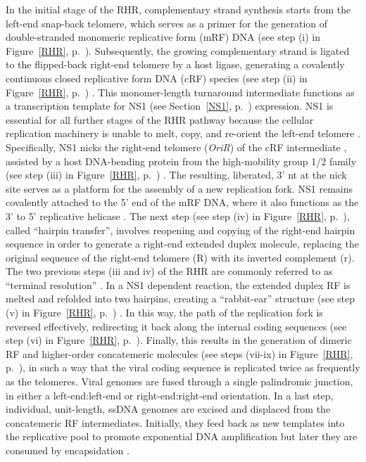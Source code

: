 In the initial stage of the RHR, complementary strand synthesis starts from the left-end snap-back telomere, which serves as a primer for the generation of double-stranded monomeric replicative form (mRF) DNA (see step (i) in Figure~\ref{RHR}, p.~\pageref{RHR}). Subsequently, the growing complementary strand is ligated to the flipped-back right-end telomere by a host ligase, generating a covalently continuous closed replicative form DNA (cRF) species (see step (ii) in Figure~\ref{RHR}, p.~\pageref{RHR}) \cite{pmid2911112, pmid2543770}. This monomer-length turnaround intermediate functions as a transcription template for NS1 (see Section~\ref{NS1}, p.~\pageref{NS1}) expression. NS1 is essential for all further stages of the RHR pathway because the cellular replication machinery is unable to melt, copy, and re-orient the left-end telomere \cite{pmid8995615}. Specifically, NS1 nicks the right-end telomere (\textit{OriR}) of the cRF intermediate \cite{pmid9349487}, assisted by a host DNA-bending protein from the high-mobility group 1/2 family (see step (iii) in Figure~\ref{RHR}, p.~\pageref{RHR}) \cite{pmid9765384}. The resulting, liberated, 3' nt at the nick site serves as a platform for the assembly of a new replication fork. NS1 remains covalently attached to the 5' end of the mRF DNA, where it also functions as the 3' to 5' replicative helicase \cite{pmid12050365, pmid3339715, pmid3203742}. The next step (see step (iv) in Figure~\ref{RHR}, p.~\pageref{RHR}), called ``hairpin transfer'', involves reopening and copying of the right-end hairpin sequence in order to generate a right-end extended duplex molecule, replacing the original sequence of the right-end telomere (R) with its inverted complement (r). The two previous steps (iii and iv) of the RHR are commonly referred to as ``terminal resolution'' \cite{telomere2}. In a NS1 dependent reaction, the extended duplex RF is melted and refolded into two hairpins, creating a ``rabbit-ear'' structure (see step (v) in Figure~\ref{RHR}, p.~\pageref{RHR}) \cite{pmid14997524, pmid12075084}. In this way, the path of the replication fork is reversed effectively, redirecting it back along the internal coding sequences (see step (vi) in Figure~\ref{RHR}, p.~\pageref{RHR}). Finally, this results in the generation of dimeric RF and higher-order concatemeric molecules (see steps (vii-ix) in Figure~\ref{RHR}, p.~\pageref{RHR}), in such a way that the viral coding sequence is replicated twice as frequently as the telomeres. Viral genomes are fused through a single palindromic junction, in either a left-end:left-end or right-end:right-end orientation. In a last step, individual, unit-length, ssDNA genomes are excised and displaced from the concatemeric RF intermediates. Initially, they feed back as new templates into the replicative pool to promote exponential DNA amplification but later they are consumed by encapsidation \cite{pmid15681430, encapsidation}.           




